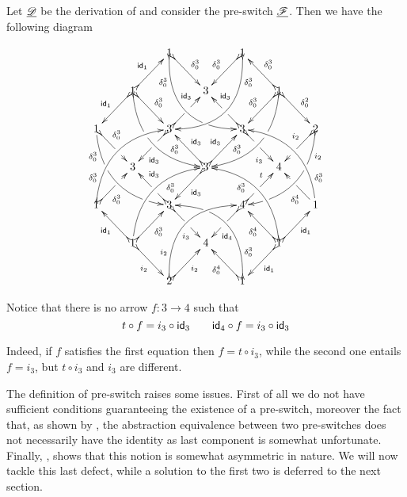 \begin{example}\label{ex:abs2}
Let $\underline{\mathscr{D}}$ be the derivation of  and consider the pre-switch $\underline{\mathscr{F}}$. Then we have the following diagram


	\[\xymatrix@C=22pt@R=22pt{&&1 \ar@{>->}@/_.9cm/[ddrr]_(.2){\delta^3_0}|(.72)\hole
	\ar@{>->}[dr]^{\delta^3_0}&& 1\ar@{>->}@/^.9cm/[ddll]^(.2){\delta^3_0}
	\ar@{>->}[dl]_{\delta^3_0}\\
	&1\ar@{>->}[dr]^{\delta^3_0}\ar@{>->}[dl]_{\id{1}}
	\ar@{>->}@/_.7cm/[ddrr]|(.38)\hole^(.7){\delta^3_0}\ar@{>->}[ur]^{\id{1}}&& 3 &&
	1
	\ar@{>->}@/^.7cm/[ddll]|(.38)\hole_(.7){\delta^3_0}\ar@{>->}[dl]_{\delta^3_0}\ar@{>->}[lu]_{\delta^3_0}
	\ar@{>->}[dr]^{\delta^2_0}\\
	1 \ar@/_.7cm/[ddrr]_(.2){\delta^3_0}|(.325)\hole|(.81)\hole
	\ar@{>->}[dr]^(.35){\delta^3_0}|(.6)\hole && 3
	\ar@{>->}[dl]|(.4)\hole^(.65){\id{3}}\ar@{>->}[ur]|(.5)\hole^(.7){\id{3} }&&3
	\ar@{>->}[dr]|(.4)\hole_(.65){i_3}
	\ar@{>->}[ul]|(.475)\hole_(.7){\id{3}}&&2\ar@{>->}@/^.7cm/[ddll]^(.2){i_2}|(.325)\hole|(.81)\hole\ar@{>->}[dl]_(.35){i_2}|(.6)\hole\\
	&3 &&3	\ar@{>->}[dl]^{\id{3}}\ar@{>->}[ur]^{\id{3}}\ar@{>->}[ul]_{\id{3}}&&4\\
	1	\ar@{>->}@/^.7cm/[uurr]^(.2){\delta^3_0} \ar@{>->}[ur]_(.35){\delta^3_0}|(.61)\hole && 3	\ar@{>->}[ul]|(.4)\hole_(.65){\id{3}}\ar@{>->}[dr]|(.5)\hole_(.65){i_3}	&&4\ar@{>->}[ur]|(.4)\hole^(.65){t} \ar@{>->}[dl]|(.5)\hole^(.65){\id{4}}	&& 1\ar[ul]^(.35){\delta^4_0}|(.61)\hole\ar@/_.7cm/[uull]_(.2){\delta^3_0}\\ 
	&1	\ar@{>->}[ur]_{\delta^3_0} \ar@{>->}[dr]_{i_2}	\ar@{>->}[ul]^{\id{1}}\ar@/^.7cm/[uurr]_(.65){\delta^3_0}&&4&& 1\ar@{>->}[ur]_{\id{1}} \ar@{>->}[ul]^{\delta^4_0} \ar@{>->}[dl]^{\id{1}} \ar@{>->}@/_.7cm/[uull]^(.65){\delta^3_0}\\&& 2	\ar@{>->}[ur]_{i_2}\ar@{>->}@/^.9cm/[uurr]^(.2){i_2}&& 1 \ar@{>->}[ul]^{\delta^4_0} \ar@{>->}@/_.9cm/[uull]_(.2){\delta^3_0} |(.72)\hole }\] 

Notice that there is no arrow $f\colon 3\to 4$ such that 
\[t\circ f=i_3\circ \mathsf{id}_{3} \qquad \mathsf{id}_{4}\circ f=i_3\circ \mathsf{id}_{3}\]

Indeed, if $f$ satisfies the first equation then $f=t\circ i_3$, while the second one entails $f=i_3$, but $t\circ i_3$ and $i_3$ are different.
\end{example}

The definition of pre-switch raises some issues. First of all we do not have sufficient conditions guaranteeing the existence of a pre-switch, moreover the fact that, as shown by , the abstraction equivalence between two pre-switches does not necessarily have the identity as last component is somewhat unfortunate. Finally, , shows that this notion  is somewhat asymmetric in nature.  We will now tackle this last defect, while a solution to the first two is deferred to the next section.


